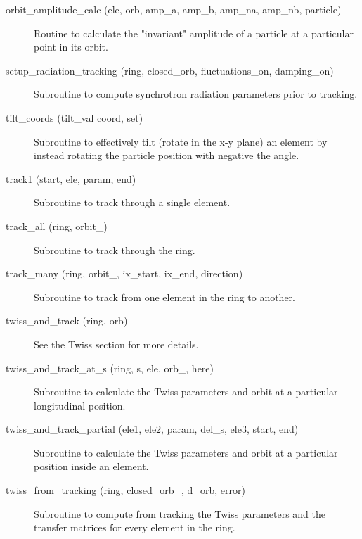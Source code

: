 \begin{description}
\item[orbit\_amplitude\_calc (ele, orb, amp\_a, amp\_b, amp\_na, amp\_nb, particle)] \Newline
Routine to calculate the "invariant" amplitude of a particle at a 
particular point in its orbit. 

\item[setup\_radiation\_tracking (ring, closed\_orb, fluctuations\_on, damping\_on)] \Newline
Subroutine to compute synchrotron radiation parameters prior to tracking. 

\item[tilt\_coords (tilt\_val coord, set)] \Newline
Subroutine to effectively tilt (rotate in the x-y plane) an element by 
instead rotating the particle position with negative the angle. 

\item[track1 (start, ele, param, end)] \Newline
Subroutine to track through a single element. 

\item[track\_all (ring, orbit\_)] \Newline
Subroutine to track through the ring. 

\item[track\_many (ring, orbit\_, ix\_start, ix\_end, direction)] \Newline
Subroutine to track from one element in the ring to another. 

\item[twiss\_and\_track (ring, orb)] \Newline
See the Twiss section for more details. 

\item[twiss\_and\_track\_at\_s (ring, s, ele, orb\_, here)] \Newline
Subroutine to calculate the Twiss parameters and orbit at a particular longitudinal position. 

\item[twiss\_and\_track\_partial (ele1, ele2, param, del\_s, ele3, start, end)] \Newline
Subroutine to calculate the Twiss parameters and orbit at a particular position inside an element. 

\item[twiss\_from\_tracking (ring, closed\_orb\_, d\_orb, error)] \Newline
Subroutine to compute from tracking the Twiss parameters and the transfer matrices 
for every element in the ring. 

\end{description}

